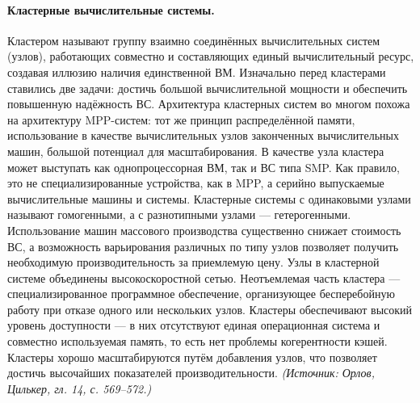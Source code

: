 \documentclass[a4paper,12pt]{article}
\begin{document}
\paragraph{Кластерные вычислительные системы.}
Кластером называют группу взаимно соединённых вычислительных систем (узлов), работающих совместно и составляющих единый вычислительный ресурс, создавая иллюзию наличия единственной ВМ. Изначально перед кластерами ставились две задачи: достичь большой вычислительной мощности и обеспечить повышенную надёжность ВС. Архитектура кластерных систем во многом похожа на архитектуру MPP-систем: тот же принцип распределённой памяти, использование в качестве вычислительных узлов законченных вычислительных машин, большой потенциал для масштабирования. В качестве узла кластера может выступать как однопроцессорная ВМ, так и ВС типа SMP. Как правило, это не специализированные устройства, как в MPP, а серийно выпускаемые вычислительные машины и системы. Кластерные системы с одинаковыми узлами называют гомогенными, а с разнотипными узлами — гетерогенными. Использование машин массового производства существенно снижает стоимость ВС, а возможность варьирования различных по типу узлов позволяет получить необходимую производительность за приемлемую цену. Узлы в кластерной системе объединены высокоскоростной сетью. Неотъемлемая часть кластера — специализированное программное обеспечение, организующее бесперебойную работу при отказе одного или нескольких узлов. Кластеры обеспечивают высокий уровень доступности — в них отсутствуют единая операционная система и совместно используемая память, то есть нет проблемы когерентности кэшей. Кластеры хорошо масштабируются путём добавления узлов, что позволяет достичь высочайших показателей производительности.
\textit{(Источник: Орлов, Цилькер, гл. 14, с. 569--572.)}
\end{document}
